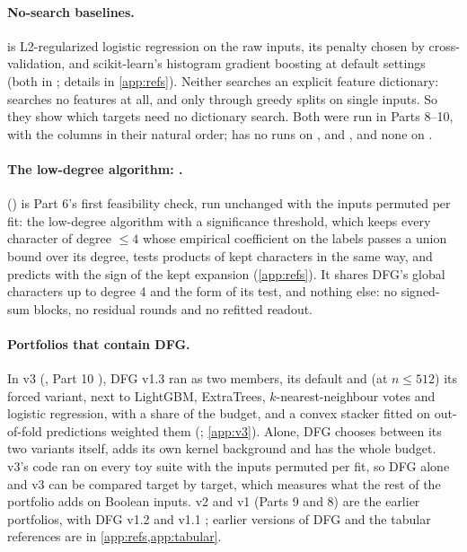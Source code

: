 \paragraph{No-search baselines.}  is L2-regularized logistic regression on the raw inputs, its penalty chosen by cross-validation, and  scikit-learn's histogram gradient boosting at default settings \cite{pedregosa2011sklearn} (both in ; details in \cref{app:refs}). Neither searches an explicit feature dictionary:  searches no features at all, and  only through greedy splits on single inputs. So they show which targets need no dictionary search. Both were run in Parts 8--10, with the columns in their natural order;  has no runs on ,  and , and  none on .

\paragraph{The low-degree algorithm: .}  () is Part 6's first feasibility check, run unchanged with the inputs permuted per fit: the low-degree algorithm \cite{linial1993constant} with a significance threshold, which keeps every character of degree $\le4$ whose empirical coefficient on the labels passes a union bound over its degree, tests products of kept characters in the same way, and predicts with the sign of the kept expansion (\cref{app:refs}). It shares DFG's global characters up to degree 4 and the form of its test, and nothing else: no signed-sum blocks, no residual rounds and no refitted readout.

\paragraph{Portfolios that contain DFG.} In v3 (, Part 10 \cite{portfoliolearner2026}), DFG v1.3 ran as two members, its default and (at $n\le512$) its forced variant, next to LightGBM, ExtraTrees, $k$-nearest-neighbour votes and logistic regression, with a share of the budget, and a convex stacker fitted on out-of-fold predictions weighted them (; \cref{app:v3}). Alone, DFG chooses between its two variants itself, adds its own kernel background and has the whole budget. v3's code ran on every toy suite with the inputs permuted per fit, so DFG alone and v3 can be compared target by target, which measures what the rest of the portfolio adds on Boolean inputs. v2 and v1 (Parts 9 and 8) are the earlier portfolios, with DFG v1.2 and v1.1 \cite{discretelearners2026}; earlier versions of DFG and the tabular references are in \cref{app:refs,app:tabular}.

